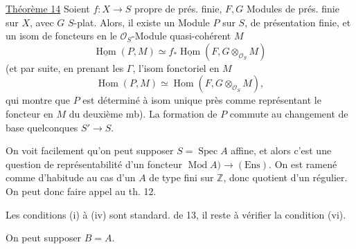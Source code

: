 \uline{Théorème 14} Soient $f:X\longrightarrow S$ propre de prés. finie, $F,G$ Modules de prés. finie sur $X$, avec $G$ $S$-plat. Alors,  il existe un Module $P$ sur $S$, de présentation finie, et un isom de foncteurs en le $\mathcal O_S$-Module quasi-cohérent $M$
\[
 \underline{\operatorname{Hom}}(P,M)\simeq
 f_*\underline{\operatorname{Hom}}(F,G\otimes_{\mathcal O_S} M)
\]
(et par suite, en prenant les $\Gamma$, l'isom fonctoriel en $M$
\[
 \operatorname{Hom}(P,M)\simeq\operatorname{Hom}(F,G\otimes_{\mathcal O_S}M),
\]
qui montre que $P$ est déterminé à isom unique près comme représentant le foncteur en $M$ du deuxième mb). La formation de $P$ commute au changement de base quelconques $S'\longrightarrow S$.

On voit facilement qu'on peut supposer $S=\operatorname{Spec}A$ affine, et alors c'est une question de représentabilité d'un foncteur $\operatorname{Mod} A)\longrightarrow(\mathrm{Ens})$. On est ramené comme d'habitude au cas d'un $A$ de type fini sur $\mathbb Z$, donc quotient d'un régulier. On peut donc faire appel au th. 12.

Les conditions (i) à (iv) sont standard.   de  13, il reste à vérifier la condition (vi).

On peut supposer $B=A$.

